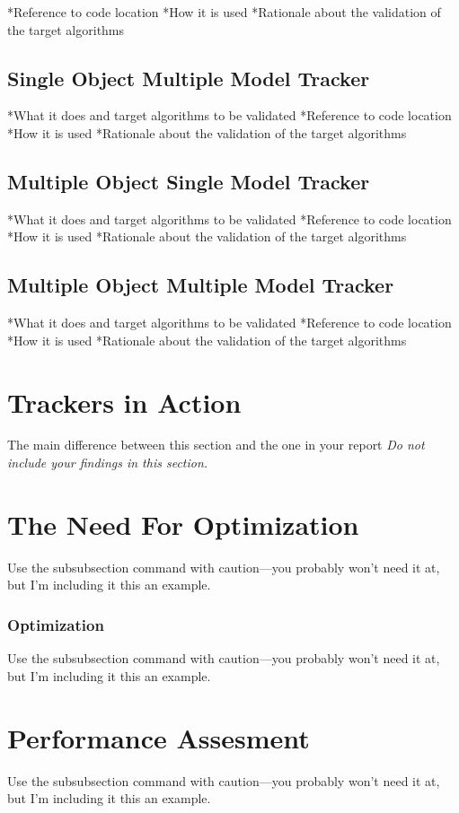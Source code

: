 \documentclass[peerreview]{IEEEtran}
\begin{document}
*Reference to code location
*How it is used
*Rationale about the validation of the target algorithms

\subsection{Single Object Multiple Model Tracker}
*What it does and target algorithms to be validated
*Reference to code location
*How it is used
*Rationale about the validation of the target algorithms
\subsection{Multiple Object Single Model Tracker}
*What it does and target algorithms to be validated
*Reference to code location
*How it is used
*Rationale about the validation of the target algorithms
\subsection{Multiple Object Multiple Model Tracker}
*What it does and target algorithms to be validated
*Reference to code location
*How it is used
*Rationale about the validation of the target algorithms

\section{Trackers in Action}
The main difference between this section and the one in your report 
\emph{Do not include your findings in this section.}

\section{The Need For Optimization}
Use the subsubsection command with caution---you probably won't need it at, but I'm including it this an example.


\subsubsection{Optimization}
Use the subsubsection command with caution---you probably won't need it at, but I'm including it this an example.

\section{Performance Assesment}
Use the subsubsection command with caution---you probably won't need it at, but I'm including it this an example.
\end{document}
